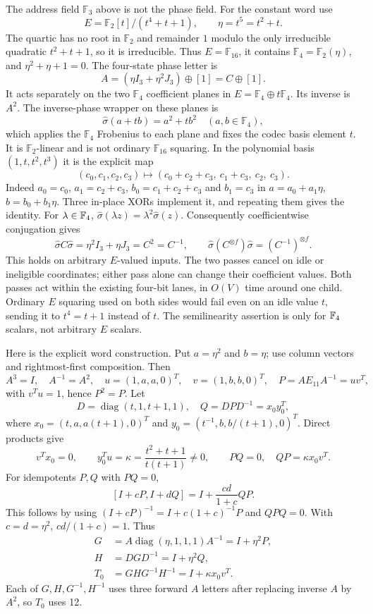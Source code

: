 The address field $\mathbb F_3$ above is not the phase field. For the
constant word use
\[
 E=\mathbb F_2[t]/(t^4+t+1),\qquad \eta=t^5=t^2+t.
\]
The quartic has no root in $\mathbb F_2$ and remainder $1$ modulo the
only irreducible quadratic $t^2+t+1$, so it is irreducible. Thus
$E=\mathbb F_{16}$, it contains $\mathbb F_4=\mathbb F_2(\eta)$, and
$\eta^2+\eta+1=0$. The four-state phase letter is
\[
 A=(\eta I_3+\eta^2J_3)\oplus[1]=C\oplus[1].
\]
It acts separately on the two $\mathbb F_4$ coefficient planes in
$E=\mathbb F_4\oplus t\mathbb F_4$. Its inverse is $A^2$.
The inverse-phase wrapper on these planes is
\[
 \widehat\sigma(a+tb)=a^2+t b^2\quad(a,b\in\mathbb F_4),       \tag{A.17}
\]
which applies the $\mathbb F_4$ Frobenius to each plane and fixes the
codec basis element $t$. It is $\mathbb F_2$-linear and is not ordinary
$\mathbb F_{16}$ squaring.
In the polynomial basis $(1,t,t^2,t^3)$ it is the explicit map
\[
 (c_0,c_1,c_2,c_3)\longmapsto
 (c_0+c_2+c_3,\ c_1+c_3,\ c_2,\ c_3).
\]
Indeed $a_0=c_0$, $a_1=c_2+c_3$, $b_0=c_1+c_2+c_3$ and
$b_1=c_3$ in $a=a_0+a_1\eta$, $b=b_0+b_1\eta$.
Three in-place XORs implement it, and repeating them gives the identity.
For $\lambda\in\mathbb F_4$,
$\widehat\sigma(\lambda z)=\lambda^2\widehat\sigma(z)$.
Consequently coefficientwise conjugation gives
\[
 \widehat\sigma C\widehat\sigma
   =\eta^2I_3+\eta J_3=C^2=C^{-1},
 \qquad
 \widehat\sigma(C^{\otimes f})\widehat\sigma
   =(C^{-1})^{\otimes f}.
\]
This holds on arbitrary $E$-valued inputs. The two passes cancel on
idle or ineligible coordinates; either pass alone can change their
coefficient values. Both passes act within the existing four-bit lanes,
in $O(V)$ time around one child. Ordinary $E$ squaring used on both
sides would fail even on an idle value $t$, sending it to
$t^4=t+1$ instead of $t$. The semilinearity assertion is only for
$\mathbb F_4$ scalars, not arbitrary $E$ scalars.

Here is the explicit word construction. Put $a=\eta^2$ and $b=\eta$;
use column vectors and rightmost-first composition. Then
\[
 A^3=I,\quad A^{-1}=A^2,\quad
 u=(1,a,a,0)^T,\quad v=(1,b,b,0)^T,\quad
 P=AE_{11}A^{-1}=uv^T,
\]
with $v^Tu=1$, hence $P^2=P$. Let
\[
 D=\operatorname{diag}(t,1,t+1,1),\quad Q=DPD^{-1}=x_0y_0^T,
\]
where $x_0=(t,a,a(t+1),0)^T$ and
$y_0=(t^{-1},b,b/(t+1),0)^T$. Direct products give
\[
 v^Tx_0=0,\qquad y_0^Tu=\kappa
 =\frac{t^2+t+1}{t(t+1)}\ne0,
 \qquad PQ=0,\quad QP=\kappa x_0v^T.                 \tag{A.18}
\]
For idempotents $P,Q$ with $PQ=0$,
\[
 [I+cP,I+dQ]=I+\frac{cd}{1+c}QP.                    \tag{A.19}
\]
This follows by using $(I+cP)^{-1}=I+c(1+c)^{-1}P$ and
$QPQ=0$. With $c=d=\eta^2$, $cd/(1+c)=1$. Thus
\[
\begin{aligned}
 G&=A\operatorname{diag}(\eta,1,1,1)A^{-1}=I+\eta^2P,\\
 H&=DGD^{-1}=I+\eta^2Q,\\
 T_0&=GHG^{-1}H^{-1}=I+\kappa x_0v^T.
\end{aligned}\tag{A.20}
\]
Each of $G,H,G^{-1},H^{-1}$ uses three forward $A$ letters after
replacing inverse $A$ by $A^2$, so $T_0$ uses 12.

